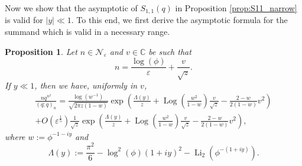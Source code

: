 \documentclass[11pt,reqno]{amsart}
\newtheorem{proposition}[theorem]{Proposition}
\theoremstyle{remark}
\numberwithin{equation}{section}
\def\Log{\operatorname{Log}}
\def\Li{\operatorname{Li}}
\def\Log{\operatorname{Log}}
\def\Li{\operatorname{Li}}
\begin{document}
Now we show that the asymptotic of $S_{1,1}(q)$ in Proposition \ref{prop:S11_narrow} is valid for $|y|\ll 1$. To this end, we first derive the asymptotic formula for the summand which is valid in a necessary range. 
\begin{proposition}\label{prop:wider}
	Let $n \in \mathcal{N}_{\varepsilon}$ and $v \in \mathbb{C}$ be such that
	\[
		n = \frac{\log(\phi)}{\varepsilon} + \frac{v}{\sqrt{z}}. 
	\]
	If $y \ll 1$, then we have, uniformly in $v$,
	\begin{multline*}
		\frac{n q^{n^2}}{(q;q)_n} = \frac{\log(w^{-1})}{\sqrt{2\pi z(1-w)}} \exp\left(\frac{\Lambda (y)}{z} + \Log\left(\frac{w^2}{1-w}\right)\frac{v}{\sqrt{z}} - \frac{2-w}{2(1-w)}  v^2   \right) \\
		+ O\left(\varepsilon^{\frac{1}{5}}\right) \frac{1}{\sqrt{z}} \exp\left(\frac{\Lambda (y)}{z} + \Log\left(\frac{w^2}{1-w}\right)\frac{v}{\sqrt{z}} - \frac{2-w}{2(1-w)}  v^2   \right),
	\end{multline*}
	where $w := \phi^{-1-iy}$ and
	\begin{equation}\label{eq:Lamma}
		\Lambda(y) := \frac{\pi^2}{6} - \log^2(\phi) (1+iy)^2 - \Li_2 ( \phi^{-(1+iy)} ).
	\end{equation}
\end{proposition}
\end{document}
